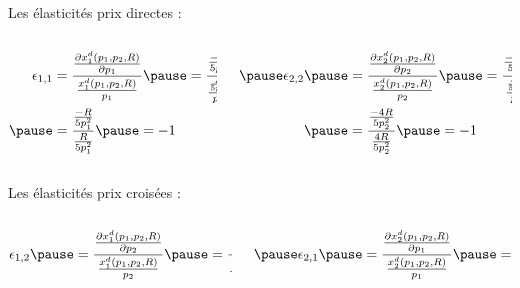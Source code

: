 \documentclass[9pt,handout,professionalfonts,hyperref]{beamer}
\begin{document}
\begin{frame}
	
	Les élasticités prix directes :\newline 
	
	\begin{columns}
		\begin{column}{0.5\textwidth}
			\large 
			\[\begin{aligned}
			\epsilon_{1,1} 
			&= \frac{\frac{\partial x_1^d(p_1,p_2,R)}{\partial p_1}}{\frac{x_1^d(p_1,p_2,R) }{p_1}} \pause= \frac{\frac{-R}{5p_1^2}}{\frac{\frac{R}{5p_1}}{p_1}} \\
			\pause&= \frac{\frac{-R}{5p_1^2}}{\frac{R}{5p_1^2}}\pause= -1
			\end{aligned}\]
		\end{column}
		\begin{column}{0.5\textwidth}
			\large 
			\[\begin{aligned}
			\pause 	\epsilon_{2,2} 
			\pause 	&= \frac{\frac{\partial x_2^d(p_1,p_2,R)}{\partial p_2}}{\frac{x_2^d(p_1,p_2,R) }{p_2}} \pause= \frac{\frac{-4R}{5p_2^2}}{\frac{\frac{4R}{5p_2}}{p_2}} \\
			\pause&= \frac{\frac{-4R}{5p_2^2}}{\frac{4R}{5p_2^2}}\pause= -1
			\end{aligned}\]
		\end{column}
	\end{columns}
	
	\bigskip 	
	
	Les élasticités prix croisées  :\newline 
	
	\begin{columns}
		\begin{column}{0.5\textwidth}
			\large 
			\[\begin{aligned}
			\epsilon_{1,2} 
			\pause 	&= \frac{\frac{\partial x_1^d(p_1,p_2,R)}{\partial p_2}}{\frac{x_1^d(p_1,p_2,R) }{p_2}} \pause= \frac{0}{\frac{\frac{R}{5p_1}}{p_2}} = 0 
			\end{aligned}\]
		\end{column}
		\begin{column}{0.5\textwidth}
			\large 
			\[\begin{aligned}
			\pause 		\epsilon_{2,1} 
			\pause 		&= \frac{\frac{\partial x_2^d(p_1,p_2,R)}{\partial p_1}}{\frac{x_2^d(p_1,p_2,R) }{p_1}} \pause= \frac{0}{\frac{\frac{4R}{5p_2}}{p_2}} = 0
			\end{aligned}\]
		\end{column}
	\end{columns}
	
\end{frame} 
\end{document}

